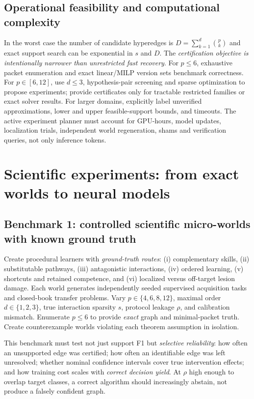 \documentclass[11pt,a4paper]{article}
\theoremstyle{definition}\newtheorem{definition}[theorem]{Definition}
\theoremstyle{remark}\newtheorem{remark}[theorem]{Remark}
\begin{document}
\subsection{Operational feasibility and computational complexity}
In the worst case the number of candidate hyperedges is $D=\sum_{k=1}^{d}\binom pk$ and exact support search can be exponential in $s$ and $D$. The \emph{certification objective is intentionally narrower than unrestricted fast recovery}. For $p\le6$, exhaustive packet enumeration and exact linear/MILP version sets benchmark correctness. For $p\in[6,12]$, use $d\le3$, hypothesis-pair screening and sparse optimization to propose experiments; provide certificates only for tractable restricted families or exact solver results. For larger domains, explicitly label unverified approximations, lower and upper feasible-support bounds, and timeouts. The active experiment planner must account for GPU-hours, model updates, localization trials, independent world regeneration, shams and verification queries, not only inference tokens.

\section{Scientific experiments: from exact worlds to neural models}\label{sec:eval}
\subsection{Benchmark 1: controlled scientific micro-worlds with known ground truth}
Create procedural learners with \emph{ground-truth routes}: (i) complementary skills, (ii) substitutable pathways, (iii) antagonistic interactions, (iv) ordered learning, (v) shortcuts and retained competence, and (vi) localized versus off-target lesion damage. Each world generates independently seeded supervised acquisition tasks and closed-book transfer problems. Vary $p\in\{4,6,8,12\}$, maximal order $d\in\{1,2,3\}$, true interaction sparsity $s$, protocol leakage $\rho$, and calibration mismatch. Enumerate $p\le6$ to provide \emph{exact} graph and minimal-packet truth. Create counterexample worlds violating each theorem assumption in isolation.

This benchmark must test not just support F1 but \emph{selective reliability}: how often an unsupported edge was certified; how often an identifiable edge was left unresolved; whether nominal confidence intervals cover true intervention effects; and how training cost scales with \emph{correct decision yield}. At $\rho$ high enough to overlap target classes, a correct algorithm should increasingly abstain, not produce a falsely confident graph.
\end{document}
